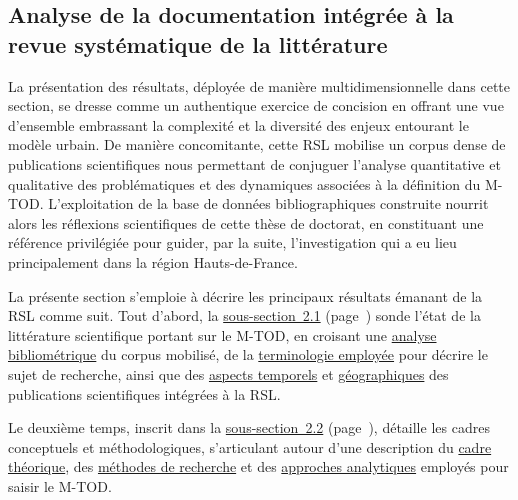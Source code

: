 \begin{refsegment}
    \newpage
\section{Analyse de la documentation intégrée à la revue systématique de la littérature
    \label{chap2:analyse-documentation-rsl}
    }

La présentation des résultats, déployée de manière multidimensionnelle dans cette section, se dresse comme un authentique exercice de concision en offrant une vue d'ensemble embrassant la complexité et la diversité des enjeux entourant le modèle urbain. De manière concomitante, cette \acrshort{RSL} mobilise un corpus dense de publications scientifiques nous permettant de conjuguer l'analyse quantitative et qualitative des problématiques et des dynamiques associées à la définition du \acrshort{M-TOD}. L'exploitation de la base de données bibliographiques construite nourrit alors les réflexions scientifiques de cette thèse de doctorat, en constituant une référence privilégiée pour guider, par la suite, l'investigation qui a eu lieu principalement dans la région Hauts-de-France.%

La présente section s'emploie à décrire les principaux résultats émanant de la \acrshort{RSL} comme suit. Tout d'abord, la \hyperref[chap2:etat-litterature-scientifique-internationale-btod]{sous-section~2.1} (page~\pageref{chap2:etat-litterature-scientifique-internationale-btod}) sonde l'état de la littérature scientifique portant sur le \acrshort{M-TOD}, en croisant une \hyperref[chap2:analyse-bibliometrique]{analyse bibliométrique} du corpus mobilisé, de la \hyperref[chap2:analyse-textuelle]{terminologie employée} pour décrire le sujet de recherche, ainsi que des \hyperref[Évolution des recherches sur les relations entre la micro-mobilité et les transports en commun]{aspects temporels} et \hyperref[chap2:exploration-terrains-geographiques]{géographiques} des publications scientifiques intégrées à la \acrshort{RSL}.%

Le deuxième temps, inscrit dans la \hyperref[chap2:cadres-conceptuels-methodologiques]{sous-section~2.2} (page~\pageref{chap2:cadres-conceptuels-methodologiques}), détaille les cadres conceptuels et méthodologiques, s'articulant autour d'une description du \hyperref[chap2:fondements-theoriques]{cadre théorique}, des \hyperref[Évaluation des démarches]{méthodes de recherche} et des \hyperref[Types d'analyse]{approches analytiques} employés pour saisir le \acrshort{M-TOD}.%


\end{refsegment}
